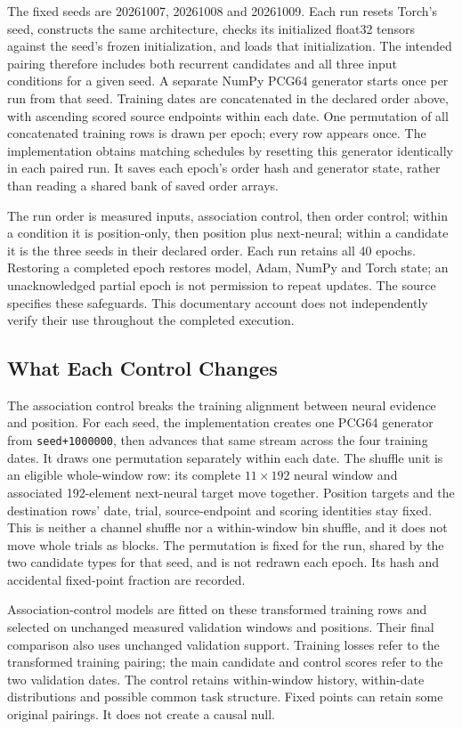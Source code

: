 The fixed seeds are 20261007, 20261008 and 20261009. Each run resets Torch's
seed, constructs the same architecture, checks its initialized float32 tensors
against the seed's frozen initialization, and loads that initialization. The
intended pairing therefore includes both recurrent candidates and all three
input conditions for a given seed. A separate NumPy PCG64 generator starts
once per run from that seed. Training dates are concatenated in the declared
order above, with ascending scored source endpoints within each date. One
permutation of all concatenated training rows is drawn per epoch; every row
appears once. The implementation obtains matching schedules by resetting this
generator identically in each paired run. It saves each epoch's order hash and
generator state, rather than reading a shared bank of saved order arrays.

The run order is measured inputs, association control, then order control;
within a condition it is position-only, then position plus next-neural; within
a candidate it is the three seeds in their declared order. Each run retains
all 40 epochs. Restoring a completed epoch restores model, Adam, NumPy and Torch
state; an unacknowledged partial epoch is not permission to repeat updates.
The source specifies these safeguards. This documentary account does not
independently verify their use throughout the completed execution.

\subsection{What Each Control Changes}

The association control breaks the training alignment between neural evidence
and position. For each seed, the implementation creates one PCG64 generator
from \texttt{seed+1000000}, then advances that same stream across the four
training dates. It draws one permutation separately within each date. The
shuffle unit is an eligible whole-window row: its complete $11\times192$
neural window and associated 192-element next-neural target move together.
Position targets and the destination rows' date, trial, source-endpoint and
scoring identities stay fixed. This is neither a channel shuffle nor a
within-window bin shuffle, and it does not move whole trials as blocks.
The permutation is fixed for the run, shared by the two candidate types for
that seed, and is not redrawn each epoch. Its hash and accidental fixed-point
fraction are recorded.

Association-control models are fitted on these transformed training rows and
selected on unchanged measured validation windows and positions. Their final
comparison also uses unchanged validation support. Training losses refer to
the transformed training pairing; the main candidate and control scores refer
to the two validation dates. The control retains within-window history,
within-date distributions and possible common task structure. Fixed points
can retain some original pairings. It does not create a causal null.

